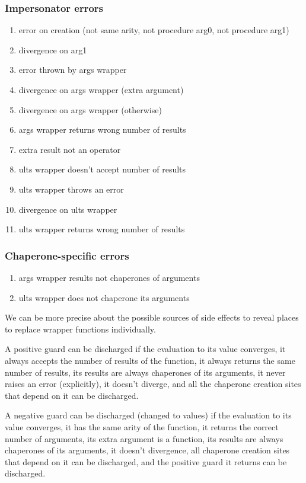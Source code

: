 \documentclass{sigplanconf}
\begin{document}
\subsubsection{Impersonator errors}
\begin{enumerate}
\item error on creation (not same arity, not procedure arg0, not procedure arg1)
\item divergence on arg1
\item error thrown by args wrapper
\item divergence on args wrapper (extra argument)
\item divergence on args wrapper (otherwise)
\item args wrapper returns wrong number of results
\item extra result not an operator
\item ults wrapper doesn't accept number of results
\item ults wrapper throws an error
\item divergence on ults wrapper
\item ults wrapper returns wrong number of results
\end{enumerate}

\subsubsection{Chaperone-specific errors}
\begin{enumerate}
\item args wrapper results not chaperones of arguments
\item ults wrapper does not chaperone its arguments
\end{enumerate}

We can be more precise about the possible sources of side effects to reveal places to replace wrapper functions individually.

A positive guard can be discharged if the evaluation to its value converges, it always accepts the number of results of the function, it always returns the same number of results, its results are always chaperones of its arguments, it never raises an error (explicitly), it doesn't diverge, and all the chaperone creation sites that depend on it can be discharged.

A negative guard can be discharged (changed to values) if the evaluation to its value converges, it has the same arity of the function, it returns the correct number of arguments, its extra argument is a function, its results are always chaperones of its arguments, it doesn't divergence, all chaperone creation sites that depend on it can be discharged, and the positive guard it returns can be discharged.
\end{document}

